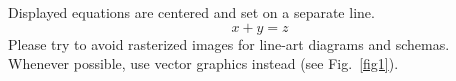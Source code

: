 \documentclass[../main.tex]{subfiles}
\begin{document}
\noindent Displayed equations are centered and set on a separate
line.
\begin{equation}
    x + y = z
\end{equation}
Please try to avoid rasterized images for line-art diagrams and
schemas. Whenever possible, use vector graphics instead (see
Fig.~\ref{fig1}).
\end{document}
